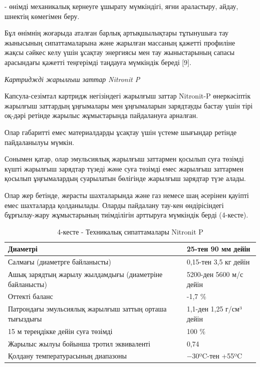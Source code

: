 \begin{multicols}{2}
- өнімді механикалық кернеуге ұшырату мүмкіндігі, яғни араластыру,
айдау, шнектің көмегімен беру.

Бұл өнімнің жоғарыда аталған барлық артықшылықтары тұтынушыға тау
жынысының сипаттамаларына және жарылған массаның қажетті профиліне жақсы
сәйкес келу үшін ұсақтау энергиясы мен тау жыныстарының сапасы
арасындағы қажетті теңгерімді таңдауға мүмкіндік береді {[}9{]}.

\emph{Картриджді жарылғыш заттар Nitronit P}

Капсула-сезімтал картридж негізіндегі жарылғыш заттар Nitronit-P
өнеркәсіптік жарылғыш заттардың ұңғымалары мен ұңғымаларын зарядтауды
бастау үшін тірі оқ-дәрі ретінде жарылыс жұмыстарында пайдалануға
арналған.

Олар габаритті емес материалдарды ұсақтау үшін үстеме шығындар ретінде
пайдаланылуы мүмкін.

Сонымен қатар, олар эмульсиялық жарылғыш заттармен қосылып суға төзімді
күшті жарылғыш зарядтар түзеді және суға төзімді емес жарылғыш заттармен
қосылып ұңғымалардың суарылатын бөлігінде жарылғыш зарядтар түзе алады.

Олар жер бетінде, жерасты шахталарында және газ немесе шаң әсерінен
қауіпті емес шахталарда қолданылады. Оларды пайдалану тау-кен
өндірісіндегі бұрғылау-жару жұмыстарының тиімділігін арттыруға мүмкіндік
берді (4-кесте).
\end{multicols}

\begin{table}[H]
\caption*{4-кесте - Техникалық сипаттамалары Nitronit P}
\centering
\begin{tabular}{|l|l|}
\hline
Диаметрі & 25-тен 90 мм дейін \\ \hline
Салмағы (диаметрге байланысты) & 0,15-тен 3,5 кг дейін \\ \hline
Ашық зарядтың жарылу жылдамдығы (диаметріне байланысты) & 5200-ден 5600 м/с дейін \\ \hline
Оттекті баланс & -1,7 \% \\ \hline
Патрондағы эмульсиялық жарылғыш заттың орташа тығыздығы & 1,1-ден 1,25 г/см³ дейін \\ \hline
15 м тереңдікке дейін суға төзімді & 100 \% \\ \hline
Жарылыс жылуы бойынша тротил эквиваленті & 0,74 \\ \hline
Қолдану температурасының диапазоны & −30ºC-тен +55ºC \\ \hline
\end{tabular}
\end{table}

